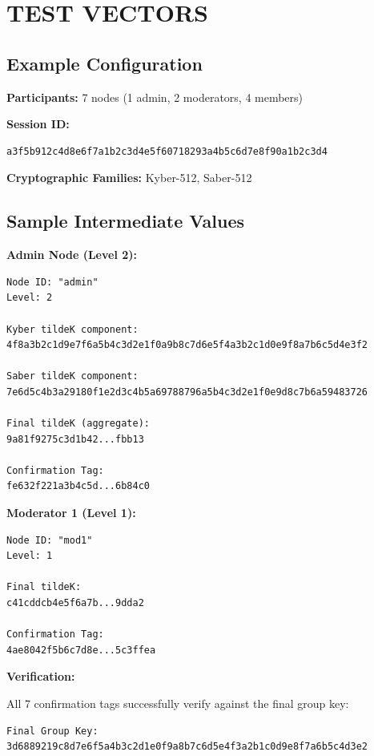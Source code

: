\documentclass[12pt,a4paper]{report}
\begin{document}
\chapter{TEST VECTORS}

\section{Example Configuration}

\textbf{Participants:} 7 nodes (1 admin, 2 moderators, 4 members)

\textbf{Session ID:} 
\begin{verbatim}
a3f5b912c4d8e6f7a1b2c3d4e5f60718293a4b5c6d7e8f90a1b2c3d4
\end{verbatim}

\textbf{Cryptographic Families:} Kyber-512, Saber-512

\section{Sample Intermediate Values}

\textbf{Admin Node (Level 2):}

\begin{verbatim}
Node ID: "admin"
Level: 2

Kyber tildeK component:
4f8a3b2c1d9e7f6a5b4c3d2e1f0a9b8c7d6e5f4a3b2c1d0e9f8a7b6c5d4e3f2

Saber tildeK component:
7e6d5c4b3a29180f1e2d3c4b5a69788796a5b4c3d2e1f0e9d8c7b6a59483726

Final tildeK (aggregate):
9a81f9275c3d1b42...fbb13

Confirmation Tag:
fe632f221a3b4c5d...6b84c0
\end{verbatim}

\textbf{Moderator 1 (Level 1):}

\begin{verbatim}
Node ID: "mod1"
Level: 1

Final tildeK:
c41cddcb4e5f6a7b...9dda2

Confirmation Tag:
4ae8042f5b6c7d8e...5c3ffea
\end{verbatim}

\textbf{Verification:}

All 7 confirmation tags successfully verify against the final group key:
\begin{verbatim}
Final Group Key:
3d6889219c8d7e6f5a4b3c2d1e0f9a8b7c6d5e4f3a2b1c0d9e8f7a6b5c4d3e2
\end{verbatim}
\end{document}
